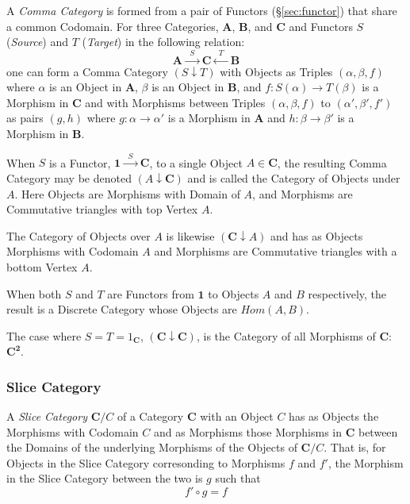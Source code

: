 A \emph{Comma Category} is formed from a pair of Functors
(\S\ref{sec:functor}) that share a common Codomain. For three
Categories, $\mathbf{A}$, $\mathbf{B}$, and $\mathbf{C}$ and Functors
$S$ (\emph{Source}) and $T$ (\emph{Target}) in the following relation:
\[
  \mathbf{A} \xrightarrow{\;\; S\;\;} \mathbf{C} \xleftarrow{\;\;
    T\;\;} \mathbf{B}
\]
one can form a Comma Category $(S \downarrow T)$ with Objects as
Triples $(\alpha, \beta, f)$ where $\alpha$ is an Object in
$\mathbf{A}$, $\beta$ is an Object in $\mathbf{B}$, and $f : S(\alpha)
\rightarrow T(\beta)$ is a Morphism in $\mathbf{C}$ and with Morphisms
between Triples $(\alpha, \beta, f)$ to $(\alpha', \beta', f')$ as
pairs $(g,h)$ where $g : \alpha \rightarrow \alpha'$ is a Morphism in
$\mathbf{A}$ and $h : \beta \rightarrow \beta'$ is a Morphism in
$\mathbf{B}$.

When $S$ is a Functor, $\mathbf{1} \xrightarrow{\;\;S\;\;}
\mathbf{C}$, to a single Object $A \in \mathbf{C}$, the resulting
Comma Category may be denoted $(A \downarrow \mathbf{C})$ and is
called the Category of Objects under $A$. Here Objects are Morphisms
with Domain of $A$, and Morphisms are Commutative triangles with top
Vertex $A$.

The Category of Objects over $A$ is likewise $(\mathbf{C} \downarrow
A)$ and has as Objects Morphisms with Codomain $A$ and Morphisms are
Commutative triangles with a bottom Vertex $A$.

When both $S$ and $T$ are Functors from $\mathbf{1}$ to Objects $A$
and $B$ respectively, the result is a Discrete Category whose Objects
are $Hom(A,B)$.

The case where $S = T = 1_\mathbf{C}$, $(\mathbf{C} \downarrow
\mathbf{C})$, is the Category of all Morphisms of $\mathbf{C}$:
$\mathbf{C}^\mathbf{2}$.



\subsubsection{Slice Category}\label{sec:slice_category}

A \emph{Slice Category} $\mathbf{C}/C$ of a Category $\mathbf{C}$ with
an Object $C$ has as Objects the Morphisms with Codomain $C$ and as
Morphisms those Morphisms in $\mathbf{C}$ between the Domains of the
underlying Morphisms of the Objects of $\mathbf{C}/C$. That is, for
Objects in the Slice Category corresonding to Morphisms $f$ and $f'$,
the Morphism in the Slice Category between the two is $g$ such that
\[
  f' \circ g = f
\]


